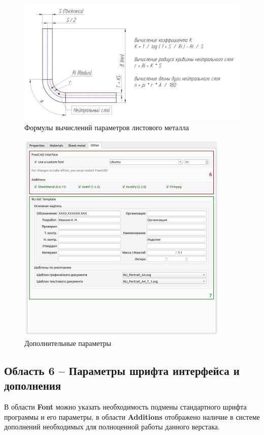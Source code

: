 \documentclass[a4paper,12pt]{article}
\begin{document}
\begin{figure}[htp]
	\centering
	\includegraphics[width=1\textwidth]{img/k_ru.png}
	\caption{Формулы вычислений параметров листового металла}
	\label{sec:k}
\end{figure}

\pagebreak


\begin{figure}[htp]
	\centering
	\includegraphics[width=0.9\textwidth]{img/pref_other.png}
	\caption{Дополнительные параметры}
	\label{sec:pref_other}
\end{figure}

\subsection{Область 6 -- Параметры шрифта интерфейса и дополнения}
В области \textbf{Font} можно указать необходимость подмены стандартного шрифта программы и его параметры, в области \textbf{Additions} отображено наличие в системе дополнений необходимых для полноценной работы данного верстака.
\end{document}

